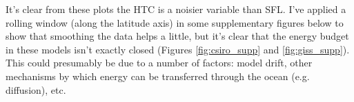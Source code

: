 It's clear from these plots the HTC is a noisier variable than SFL. I've applied a rolling window (along the latitude axis) in some supplementary figures below to show that smoothing the data helps a little, but it's clear that the energy budget in these models isn't exactly closed (Figures \ref{fig:csiro_supp} and \ref{fig:giss_supp}). This could presumably be due to a number of factors: model drift, other mechanisms by which energy can be transferred through the ocean (e.g. diffusion), etc.